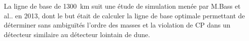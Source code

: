         La ligne de base de \SI{1300}{\kilo\meter} suit une étude de simulation menée par M.Bass et al.. en 2013\cite{Bass2013}, dont le but était de calculer la ligne de base optimale permettant de déterminer sans ambiguïtés l'ordre des masses et la violation de CP dans un détecteur similaire au détecteur lointain de \gls{dune}. %

